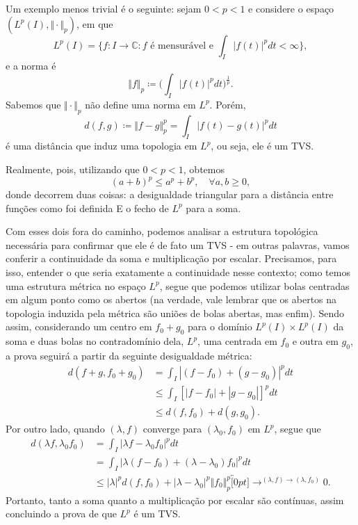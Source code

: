 \documentclass[../distribution_theory_notes.tex]{subfiles}
\begin{document}
\begin{example}
	Um exemplo menos trivial é o seguinte: sejam \(0 < p < 1\) e considere o espaço \((L^{p}(I), \Vert \cdot \Vert_{p})\), em que
	\[
		L^{p}(I) = \biggl\{f:I\rightarrow \mathbb{C}: f \text{ é mensurável e } \int_{I}^{}|f(t)|^{p}dt < \infty\biggr\},
	\]
	e a norma é
	\[
		\Vert f \Vert_{p}\coloneqq \biggl(\int_{I}^{}|f(t)|^{p}dt\biggr)^{\frac{1}{p}}.
	\]
	Sabemos que \(\Vert \cdot  \Vert_{p}\) não define uma norma em \(L^{p}\). Porém,
	\[
		d(f, g)\coloneqq \Vert f-g \Vert_{p}^{p} = \int_{I}^{}|f(t)-g(t)|^{p}dt
	\]
	é uma distância que induz uma topologia em \(L^{p}\), ou seja, ele é um TVS.

	Realmente, pois, utilizando que \(0 < p < 1\), obtemos
	\[
		(a+b)^{p}\leq a^{p}+b^{p},\quad \forall a, b\geq 0,
	\]
	donde decorrem duas coisas: a desigualdade triangular para a distância entre funções como foi definida E o fecho de \(L^{p}\) para a soma.

	Com esses dois fora do caminho, podemos analisar a estrutura topológica necessária para confirmar que ele é de fato um TVS - em outras palavras, vamos conferir a continuidade da soma e multiplicação por escalar.
	Precisamos, para isso, entender o que seria exatamente a continuidade nesse contexto; como temos uma estrutura métrica no espaço \(L^{p}\), segue que podemos utilizar bolas centradas em algum ponto como os abertos (na verdade,
	vale lembrar que os abertos na topologia induzida pela métrica são uniões de bolas abertas, mas enfim). Sendo assim, considerando um centro em \(f_{0}+g_{0}\) para o domínio \(L^{p}(I)\times L^{p}(I)\) da soma
	e duas bolas no contradomínio dela, \(L^{p}\), uma centrada em \(f_{0}\) e outra em \(g_{0}\), a prova seguirá a partir da seguinte desigualdade métrica:
	\begin{align*}
		d(f+g, f_{0}+g_{0}) & = \int_{I}^{}|(f-f_{0})+(g-g_{0})|^{p} dt   \\
		                    & \leq \int_{I}^{}[|f-f_{0}|+|g-g_{0}|]^{p}dt \\
		                    & \leq d(f, f_{0}) + d(g, g_{0}).
	\end{align*}
	Por outro lado, quando \((\lambda, f)\) converge para \((\lambda_{0}, f_{0})\) em \(L^{p}\), segue que
	\begin{align*}
		d(\lambda f, \lambda_{0}f_{0}) & = \int_{I}^{}|\lambda f - \lambda_{0}f_{0}|^{p}dt                                                                                                          \\
		                               & = \int_{I}^{}|\lambda(f-f_{0}) + (\lambda-\lambda_{0})f_{0}|^{p}dt                                                                                         \\
		                               & \leq |\lambda|^{p}d(f, f_{0}) + |\lambda -\lambda_{0}|^{p}\Vert f_{0} \Vert_{p}^{p}\overbracket[0pt]{\longrightarrow}^{(\lambda, f)\to (\lambda, f_{0})}0.
	\end{align*}
	Portanto, tanto a soma quanto a multiplicação por escalar são contínuas, assim concluindo a prova de que \(L^{p}\) é um TVS.
\end{example}
\end{document}
